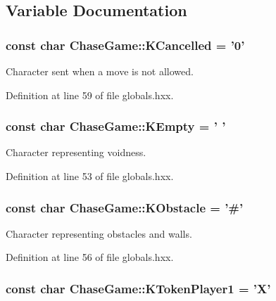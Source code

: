 \subsection{Variable Documentation}
\hypertarget{namespace_chase_game_a12d6411bb9a72150acba6060bb1587e1}{
\subsubsection[{K\-Cancelled}]{\setlength{\rightskip}{0pt plus 5cm}const char Chase\-Game\-::\-K\-Cancelled = '0'}}\label{namespace_chase_game_a12d6411bb9a72150acba6060bb1587e1}


Character sent when a move is not allowed. 



Definition at line 59 of file globals.\-hxx.

\hypertarget{namespace_chase_game_aa036d4de40188ba2e1aa36ab6cfaf1da}{
\subsubsection[{K\-Empty}]{\setlength{\rightskip}{0pt plus 5cm}const char Chase\-Game\-::\-K\-Empty = ' '}}\label{namespace_chase_game_aa036d4de40188ba2e1aa36ab6cfaf1da}


Character representing voidness. 



Definition at line 53 of file globals.\-hxx.

\hypertarget{namespace_chase_game_ad86181b2050b912dab9d69d2f0bea76e}{
\subsubsection[{K\-Obstacle}]{\setlength{\rightskip}{0pt plus 5cm}const char Chase\-Game\-::\-K\-Obstacle = '\#'}}\label{namespace_chase_game_ad86181b2050b912dab9d69d2f0bea76e}


Character representing obstacles and walls. 



Definition at line 56 of file globals.\-hxx.

\hypertarget{namespace_chase_game_a8452e2d6de618e4ca7a9f76b082b52a4}{
\subsubsection[{K\-Token\-Player1}]{\setlength{\rightskip}{0pt plus 5cm}const char Chase\-Game\-::\-K\-Token\-Player1 = 'X'}}\label{namespace_chase_game_a8452e2d6de618e4ca7a9f76b082b52a4}


